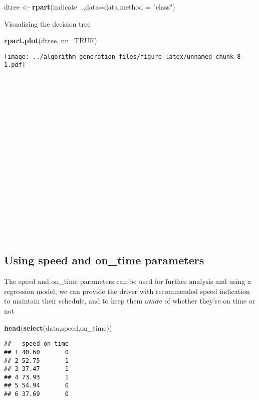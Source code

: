 \documentclass[
]{article}
\newenvironment{Shaded}{\begin{snugshade}}{\end{snugshade}}
\newcommand{\DataTypeTok}[1]{\textcolor[rgb]{0.13,0.29,0.53}{#1}}
\newcommand{\KeywordTok}[1]{\textcolor[rgb]{0.13,0.29,0.53}{\textbf{#1}}}
\newcommand{\NormalTok}[1]{#1}
\newcommand{\OperatorTok}[1]{\textcolor[rgb]{0.81,0.36,0.00}{\textbf{#1}}}
\newcommand{\OtherTok}[1]{\textcolor[rgb]{0.56,0.35,0.01}{#1}}
\newcommand{\StringTok}[1]{\textcolor[rgb]{0.31,0.60,0.02}{#1}}
\begin{document}
\begin{Shaded}
\begin{Highlighting}[]
\NormalTok{dtree <-}\StringTok{ }\KeywordTok{rpart}\NormalTok{(indicate}\OperatorTok{~}\NormalTok{.,}\DataTypeTok{data=}\NormalTok{data,}\DataTypeTok{method =} \StringTok{"class"}\NormalTok{)}
\end{Highlighting}
\end{Shaded}

Visualizing the decision tree

\begin{Shaded}
\begin{Highlighting}[]
\KeywordTok{rpart.plot}\NormalTok{(dtree, }\DataTypeTok{nn=}\OtherTok{TRUE}\NormalTok{)}
\end{Highlighting}
\end{Shaded}

\texttt{[image: ../algorithm\_generation\_files/figure-latex/unnamed-chunk-8-1.pdf]}

~

~

~

~

~

~

~

~

~

~

\hypertarget{using-speed-and-on_time-parameters}{%
\subsection{Using speed and on\_time
parameters}\label{using-speed-and-on_time-parameters}}

The speed and on\_time parameters can be used for further analysis and
using a regression model, we can provide the driver with recommended
speed indication to maintain their schedule, and to keep them aware of
whether they're on time or not

\begin{Shaded}
\begin{Highlighting}[]
\KeywordTok{head}\NormalTok{(}\KeywordTok{select}\NormalTok{(data,speed,on_time))}
\end{Highlighting}
\end{Shaded}

\begin{verbatim}
##   speed on_time
## 1 40.60       0
## 2 52.75       1
## 3 37.47       1
## 4 73.93       1
## 5 54.94       0
## 6 37.69       0
\end{verbatim}
\end{document}
